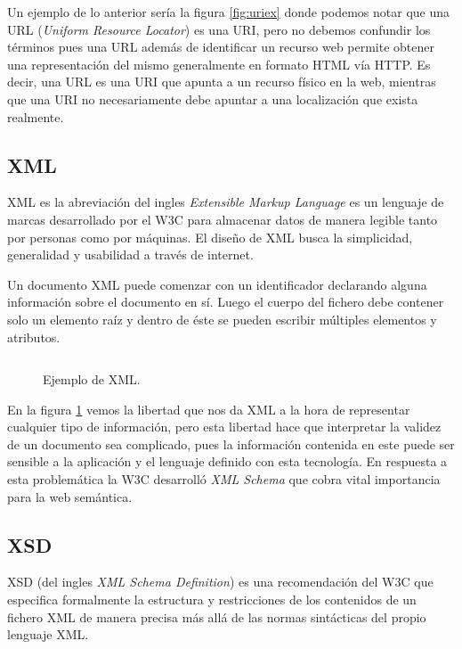Un ejemplo de lo anterior sería la figura \ref{fig:uriex} donde podemos notar
que una URL (\emph{Uniform Resource Locator}) es una URI, pero no debemos
confundir los términos pues una URL además de identificar un recurso web permite
obtener una representación del mismo generalmente en formato HTML vía HTTP. Es
decir, una URL es una URI que apunta a un recurso físico en la web, mientras que
una URI no necesariamente debe apuntar a una localización que exista realmente.

\subsection{XML}
XML es la abreviación del ingles \emph{Extensible Markup Language} es un
lenguaje de marcas desarrollado por el W3C para almacenar datos de manera
legible tanto por personas como por máquinas. 
El diseño de XML busca la simplicidad, generalidad y usabilidad a través de
internet\cite{paoli2004extensible}. 

Un documento XML puede comenzar con un identificador declarando alguna
información sobre el documento en sí. Luego el cuerpo del fichero debe contener
solo un elemento raíz y dentro de éste se pueden escribir múltiples elementos y
atributos.

\begin{figure}[htpb]
  \centering
  \begin{tabular}{c}
    
  \end{tabular}
  \caption{Ejemplo de XML.}
  \vspace{-.25cm}
  \label{fig:xmlex}
\end{figure}

En la figura \ref{fig:xmlex} vemos la libertad que nos da XML a la hora de
representar cualquier tipo de información, pero esta libertad hace que
interpretar la validez de un documento sea complicado, pues la información
contenida en este puede ser sensible a la aplicación y el lenguaje definido con
esta tecnología. En respuesta a esta problemática la W3C desarrolló \emph{XML
Schema} que cobra vital importancia para la web semántica.


\subsection{XSD}
XSD (del ingles \emph{XML Schema Definition}) es una recomendación del W3C que
especifica formalmente la estructura y restricciones de los contenidos de un
fichero XML de manera precisa más allá de las normas sintácticas del propio
lenguaje XML.

